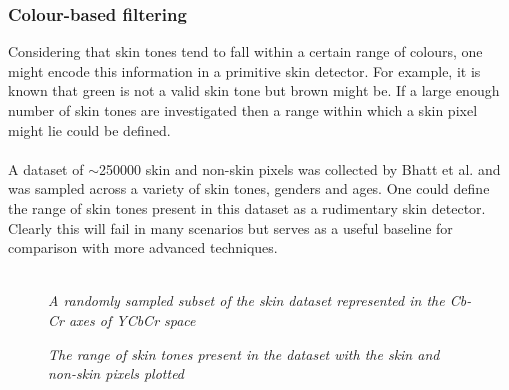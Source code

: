 \subsubsection{Colour-based filtering}
\label{section:colour-filter}
Considering that skin tones tend to fall within a certain range of colours, one might encode this information in a primitive skin detector. For example, it is known that green is not a valid skin tone but brown might be. If a large enough number of skin tones are investigated then a range within which a skin pixel might lie could be defined. 
\\ \\
A dataset of $\sim$250000 skin and non-skin pixels was collected by Bhatt et al. \cite{skinDataset} and was sampled across a variety of skin tones, genders and ages. One could define the range of skin tones present in this dataset as a rudimentary skin detector. Clearly this will fail in many scenarios but serves as a useful baseline for comparison with more advanced techniques.
\\ \\

\begin{figure}
    \centering
    \scalebox{0.8}{ }
   \caption{\textit{A randomly sampled subset of the skin dataset represented in the Cb-Cr axes of YCbCr space} }
\end{figure}
\begin{figure}
    \centering
    \scalebox{0.8}{}
   \caption{\textit{The range of skin tones present in the dataset with the skin and non-skin pixels plotted} }
\end{figure}
